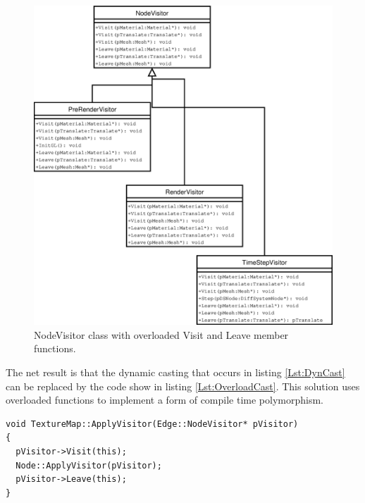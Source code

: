 \begin{figure}
    \centering
    \includegraphics[height=0.8\textheight]{NodeVisitorOverloaded}
    \caption{\label{Fig:NodeVisitorOverloaded}NodeVisitor class with overloaded Visit and Leave member functions.}
\end{figure}

The net result is that the dynamic casting that occurs in listing \ref{Lst:DynCast}
can be replaced by the code show in listing \ref{Lst:OverloadCast}. This solution uses
overloaded functions to implement a form of compile time polymorphism.

\lstset{language=C++}
\begin{lstlisting}[basicstyle={\ttfamily \footnotesize},caption={Compile time polymorphism via member function overloading},label={Lst:OverloadCast}]
void TextureMap::ApplyVisitor(Edge::NodeVisitor* pVisitor)
{
  pVisitor->Visit(this);
  Node::ApplyVisitor(pVisitor);
  pVisitor->Leave(this);
}
\end{lstlisting}

